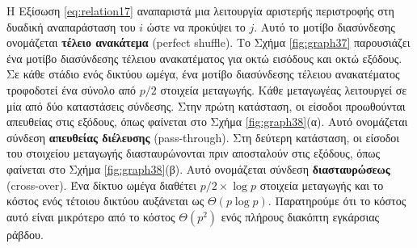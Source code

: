 \documentclass[12pt,a4paper]{article} %
\begin{document}
Η Εξίσωση \ref{eq:relation17} αναπαριστά μια λειτουργία αριστερής 
περιστροφής στη δυαδική αναπαράσταση του $i$ ώστε να προκύψει το $j$. 
Αυτό το μοτίβο διασύνδεσης ονομάζεται \textbf{τέλειο ανακάτεμα} 
(perfect shuffle). Το Σχήμα \ref{fig:graph37} 
παρουσιάζει ένα μοτίβο διασύνδεσης τέλειου ανακατέματος για
οκτώ εισόδους και οκτώ εξόδους. Σε κάθε στάδιο ενός δικτύου ωμέγα, ένα 
μοτίβο διασύνδεσης τέλειου ανακατέματος τροφοδοτεί ένα σύνολο από 
$p/2$ στοιχεία μεταγωγής. Κάθε μεταγωγέας λειτουργεί σε μία από δύο 
καταστάσεις σύνδεσης. Στην πρώτη κατάσταση, οι είσοδοι προωθούνται 
απευθείας στις εξόδους, όπως φαίνεται στο Σχήμα \ref{fig:graph38}(α). Αυτό ονομάζεται 
σύνδεση \textbf{απευθείας διέλευσης} (pass-through). Στη δεύτερη κατάσταση, 
οι είσοδοι του στοιχείου μεταγωγής διασταυρώνονται πριν αποσταλούν στις 
εξόδους, όπως φαίνεται στο Σχήμα \ref{fig:graph38}(β). Αυτό ονομάζεται σύνδεση 
\textbf{διασταυρώσεως} (cross-over). Ένα δίκτυο 
ωμέγα διαθέτει $p/2 \times \log p$ στοιχεία μεταγωγής και το κόστος ενός 
τέτοιου δικτύου αυξάνεται ως $\Theta(p \log p)$. Παρατηρούμε ότι το κόστος 
αυτό είναι μικρότερο από το κόστος $\Theta(p^2)$ ενός πλήρους διακόπτη 
εγκάρσιας ράβδου.
\vspace{0.3cm}
\end{document}
